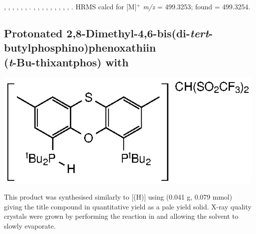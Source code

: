 

, 
,
,
, ,
,
.
,
,
,
,
,
,
,
,
,
.
HRMS calcd for  [M]$^+$ \emph{m/z} = 499.3253; found = 499.3254.



\subsection*{Protonated 2,8-Dimethyl-4,6-bis(di-\emph{tert}-butylphosphino)phenoxathiin \\(\emph{t}-Bu-thixantphos) with }

\begin{structure}[h]
\begin{center}
\includegraphics{../Structures/StBuH.eps}
\end{center}
\end{structure}

This product was synthesised similarly to [\tBuxantphos(H)] using \tButhixantphos{} (0.041 g, 0.079 mmol) giving the title compound in quantitative yield as a pale yield solid.  X-ray quality crystals were grown by performing the reaction in  and allowing the solvent to slowly evaporate.  

